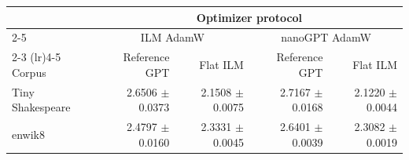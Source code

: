 \begin{tabular}{lrrrr}
\toprule
& \multicolumn{4}{c}{\textbf{Optimizer protocol}} \\
\cmidrule(lr){2-5}
& \multicolumn{2}{c}{ILM AdamW} & \multicolumn{2}{c}{nanoGPT AdamW} \\
\cmidrule(lr){2-3} \cmidrule(lr){4-5}
Corpus & Reference GPT & Flat ILM & Reference GPT & Flat ILM \\
\midrule
Tiny Shakespeare & 2.6506 $\pm$ 0.0373 & 2.1508 $\pm$ 0.0075 & 2.7167 $\pm$ 0.0168 & 2.1220 $\pm$ 0.0044 \\
enwik8 & 2.4797 $\pm$ 0.0160 & 2.3331 $\pm$ 0.0045 & 2.6401 $\pm$ 0.0039 & 2.3082 $\pm$ 0.0019 \\
\bottomrule
\end{tabular}
